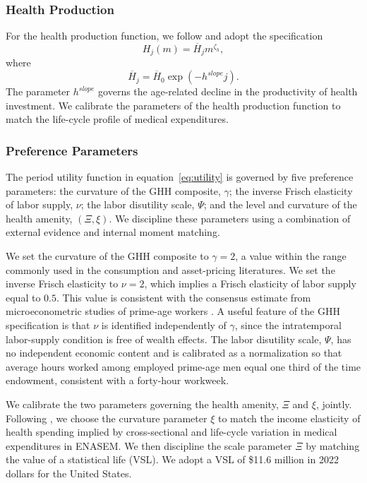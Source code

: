 \documentclass[12pt,a4paper]{article}
\begin{document}
\subsubsection{Health Production}

For the health production function, we follow \cite{Carrasco2026} and adopt the specification
\begin{equation}
    \label{eq:healthproduction}
    H_{j}(m) = \overline{H}_{j}m^{\zeta_{h}},
\end{equation}
where
\begin{equation}
    \overline{H}_{j}=\overline{H}_{0}\exp(-h^{slope}j).
\end{equation}
The parameter $h^{slope}$ governs the age-related decline in the productivity of health investment. We calibrate the parameters of the health production function to match the life-cycle profile of medical expenditures.

\subsubsection{Preference Parameters}

The period utility function in equation~\eqref{eq:utility} is governed by five preference parameters: the curvature of the GHH composite, $\gamma$; the inverse Frisch elasticity of labor supply, $\nu$; the labor disutility scale, $\Psi$; and the level and curvature of the health amenity, $(\Xi,\xi)$. We discipline these parameters using a combination of external evidence and internal moment matching.

We set the curvature of the GHH composite to $\gamma=2$, a value within the range commonly used in the consumption and asset-pricing literatures. We set the inverse Frisch elasticity to $\nu=2$, which implies a Frisch elasticity of labor supply equal to $0.5$. This value is consistent with the consensus estimate from microeconometric studies of prime-age workers \citep{chetty_etal_2011}. A useful feature of the GHH specification is that $\nu$ is identified independently of $\gamma$, since the intratemporal labor-supply condition is free of wealth effects. The labor disutility scale, $\Psi$, has no independent economic content and is calibrated as a normalization so that average hours worked among employed prime-age men equal one third of the time endowment, consistent with a forty-hour workweek.

We calibrate the two parameters governing the health amenity, $\Xi$ and $\xi$, jointly. Following \citet{hall_jones_2007}, we choose the curvature parameter $\xi$ to match the income elasticity of health spending implied by cross-sectional and life-cycle variation in medical expenditures in ENASEM. We then discipline the scale parameter $\Xi$ by matching the value of a statistical life (VSL). We adopt a VSL of \$11.6 million in 2022 dollars for the United States.
\end{document}
